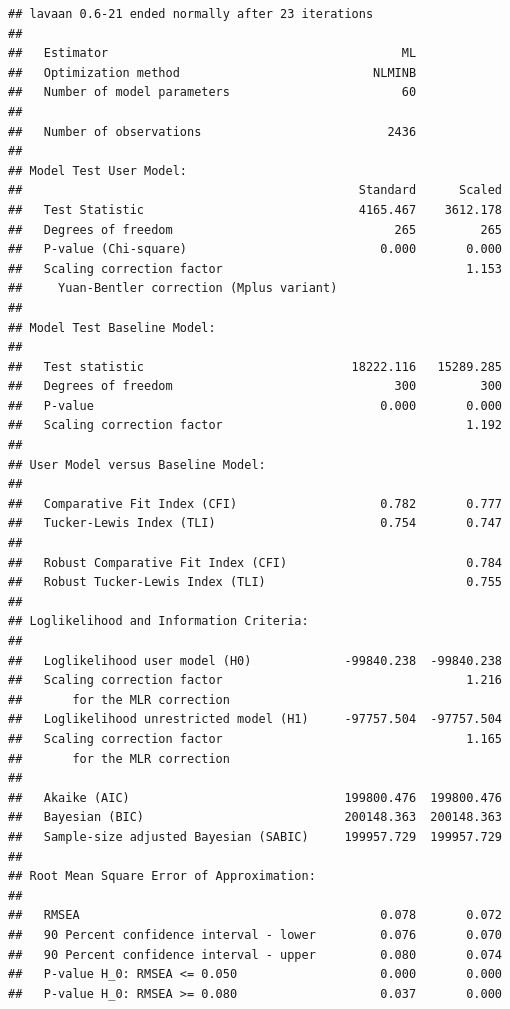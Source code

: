 \documentclass[
]{article}
\begin{document}
\begin{verbatim}
## lavaan 0.6-21 ended normally after 23 iterations
## 
##   Estimator                                         ML
##   Optimization method                           NLMINB
##   Number of model parameters                        60
## 
##   Number of observations                          2436
## 
## Model Test User Model:
##                                               Standard      Scaled
##   Test Statistic                              4165.467    3612.178
##   Degrees of freedom                               265         265
##   P-value (Chi-square)                           0.000       0.000
##   Scaling correction factor                                  1.153
##     Yuan-Bentler correction (Mplus variant)                       
## 
## Model Test Baseline Model:
## 
##   Test statistic                             18222.116   15289.285
##   Degrees of freedom                               300         300
##   P-value                                        0.000       0.000
##   Scaling correction factor                                  1.192
## 
## User Model versus Baseline Model:
## 
##   Comparative Fit Index (CFI)                    0.782       0.777
##   Tucker-Lewis Index (TLI)                       0.754       0.747
##                                                                   
##   Robust Comparative Fit Index (CFI)                         0.784
##   Robust Tucker-Lewis Index (TLI)                            0.755
## 
## Loglikelihood and Information Criteria:
## 
##   Loglikelihood user model (H0)             -99840.238  -99840.238
##   Scaling correction factor                                  1.216
##       for the MLR correction                                      
##   Loglikelihood unrestricted model (H1)     -97757.504  -97757.504
##   Scaling correction factor                                  1.165
##       for the MLR correction                                      
##                                                                   
##   Akaike (AIC)                              199800.476  199800.476
##   Bayesian (BIC)                            200148.363  200148.363
##   Sample-size adjusted Bayesian (SABIC)     199957.729  199957.729
## 
## Root Mean Square Error of Approximation:
## 
##   RMSEA                                          0.078       0.072
##   90 Percent confidence interval - lower         0.076       0.070
##   90 Percent confidence interval - upper         0.080       0.074
##   P-value H_0: RMSEA <= 0.050                    0.000       0.000
##   P-value H_0: RMSEA >= 0.080                    0.037       0.000

\end{verbatim}
\end{document}
